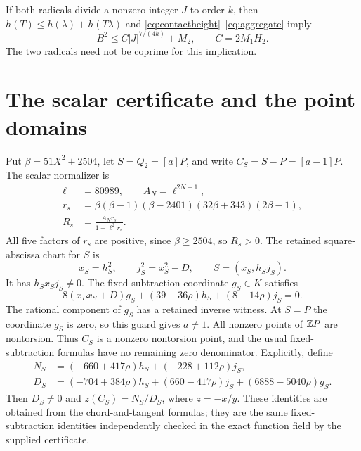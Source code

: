 \documentclass[11pt,a4paper]{article}
\begin{document}
If both radicals divide a nonzero integer $J$ to order $k$, then
$h(T)\le h(\lambda)+h(T\lambda)$ and
\eqref{eq:contactheight}--\eqref{eq:aggregate} imply
\begin{equation}\label{eq:heighttransfer}
 B^2\le C|J|^{7/(4k)}+M_2,\qquad C=2M_1H_2.
\end{equation}
The two radicals need not be coprime for this implication.

\section{The scalar certificate and the point domains}\label{sec:scalar}
Put $\beta=51X^2+2504$, let $S=Q_2=[a]P$, and write
$C_S=S-P=[a-1]P$. The scalar normalizer is
\begin{equation}\label{eq:scalarnormalizer}
 \begin{split}
 \ell&=80989,\qquad A_N=\ell^{2N+1},\\
 r_s&=\beta(\beta-1)(\beta-2401)(32\beta+343)(2\beta-1),\\
 R_s&=\frac{A_Nr_s}{1+\ell^2r_s}.
 \end{split}
\end{equation}
All five factors of $r_s$ are positive, since $\beta\ge2504$, so
$R_s>0$. The retained square-abscissa chart for $S$ is
\[
 x_S=h_S^2,\qquad j_S^2=x_S^2-D,
 \qquad S=(x_S,h_Sj_S).
\]
It has $h_Sx_Sj_S\ne0$. The fixed-subtraction coordinate $g_S\in K$
satisfies
\[
 8(x_Px_S+D)g_S+(39-36\rho)h_S+(8-14\rho)j_S=0.
\]
The rational component of $g_S$ has a retained inverse witness.
At $S=P$ the coordinate $g_S$ is zero, so this guard gives $a\ne1$.
All nonzero points of $\mathbb Z P$ are nontorsion. Thus $C_S$ is a nonzero
nontorsion point, and the usual fixed-subtraction formulas have no
remaining zero denominator. Explicitly, define
\[
 \begin{split}
 N_S&=(-660+417\rho)h_S+(-228+112\rho)j_S,\\
 D_S&=(-704+384\rho)h_S+(660-417\rho)j_S
                         +(6888-5040\rho)g_S.
 \end{split}
\]
Then $D_S\ne0$ and $z(C_S)=N_S/D_S$, where $z=-x/y$.
These identities are obtained from the chord-and-tangent formulas;
they are the same fixed-subtraction identities independently checked
in the exact function field by the supplied certificate.
\end{document}
